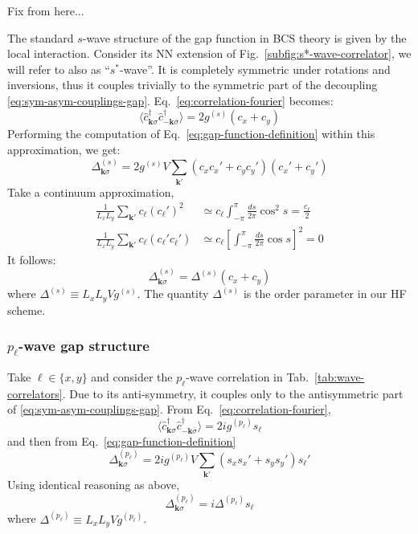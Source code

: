 {\color{tabred}Fix from here...}

The standard $s$-wave structure of the gap function in BCS theory is given by the local interaction. Consider its NN extension of Fig.~\ref{subfig:s*-wave-correlator}, we will refer to also as ``$s^*$-wave''. It is completely symmetric under rotations and inversions, thus it couples trivially to the symmetric part of the decoupling \eqref{eq:sym-asym-couplings-gap}. Eq.~\eqref{eq:correlation-fourier} becomes:
\[
	\langle 
	\hat c_{\mathbf{k}\sigma}^\dagger \hat c_{-\mathbf{k} \overline{\sigma}}^\dagger
	\rangle = 2g^{(s)} (c_x + c_y)
\]
Performing the computation of Eq.~\eqref{eq:gap-function-definition} within this approximation, we get:
\[
	\Delta_{\mathbf{k}\sigma}^{(s)} = 2g^{(s)}V \sum_{\mathbf{k}'} (c_x c_x' + c_y c_y') (c_x' + c_y')
\]
Take a continuum approximation,
\[
\begin{aligned}
	\frac{1}{L_x L _y}\sum_{\mathbf{k}'} c_\ell (c_\ell')^2 &\simeq c_\ell \int_{-\pi}^\pi \frac{ds}{2\pi} \cos^2 s = \frac{c_\ell}{2} \\
	\frac{1}{L_x L _y}\sum_{\mathbf{k}'} c_\ell (c_\ell' c_{\overline{\ell}}') &\simeq c_\ell \left[ \int_{-\pi}^\pi \frac{ds}{2\pi} \cos s \right]^2 = 0
\end{aligned}
\]
It follows:
\begin{equation}\label{eq:swave-gap}
	\Delta_{\mathbf{k}\sigma}^{(s)} = \Delta^{(s)} (c_x + c_y)
\end{equation}
where $\Delta^{(s)} \equiv L_x L_y V g^{(s)}$. The quantity $\Delta^{(s)}$ is the order parameter in our HF scheme.

\subsubsection{$p_\ell$-wave gap structure}

Take $\ell \in \lbrace x,y \rbrace$ and consider the $p_\ell$-wave correlation in Tab.~\ref{tab:wave-correlators}. Due to its anti-symmetry, it couples only to the antisymmetric part of \eqref{eq:sym-asym-couplings-gap}. From Eq.~\eqref{eq:correlation-fourier},
\[
	\langle 
		\hat c_{\mathbf{k}\sigma}^\dagger \hat c_{-\mathbf{k} \overline{\sigma}}^\dagger
	\rangle = 2i g^{(p_\ell)} s_\ell
\]
and then from Eq.~\eqref{eq:gap-function-definition}
\[
	\Delta_{\mathbf{k}\sigma}^{(p_\ell)} = 2i g^{(p_\ell)} V \sum_{\mathbf{k}'} (s_x s_x' + s_y s_y') s_\ell'
\]
Using identical reasoning as above,
\[
	\Delta_{\mathbf{k}\sigma}^{(p_\ell)} = i \Delta^{(p_\ell)} s_\ell
\]
where $\Delta^{(p_\ell)} \equiv L_x L_y V g^{(p_\ell)}$.

